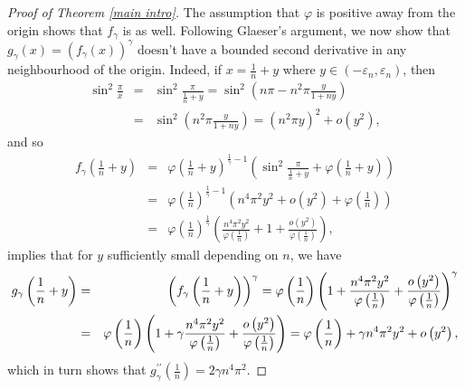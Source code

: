 \documentclass{amsart}
\theoremstyle{plain}
\numberwithin{equation}{section}
\begin{document}
\begin{proof}[Proof of Theorem \protect\ref{main intro}]
The assumption that $\varphi $ is positive away from the origin shows that $%
f_{\gamma }$ is as well. Following Glaeser's argument, we now show that $%
g_{\gamma }\left( x\right) =\left( f_{\gamma }\left( x\right) \right)
^{\gamma }$ doesn't have a bounded second derivative in any neighbourhood of
the origin. Indeed, if $x=\frac{1}{n}+y$ where $y\in \left( -\varepsilon
_{n},\varepsilon _{n}\right) $, then%
\begin{eqnarray*}
\sin ^{2}\frac{\pi }{x} &=&\sin ^{2}\frac{\pi }{\frac{1}{n}+y}=\sin
^{2}\left( n\pi -n^{2}\pi \frac{y}{1+ny}\right) \\
&=&\sin ^{2}\left( n^{2}\pi \frac{y}{1+ny}\right) =\left( n^{2}\pi y\right)
^{2}+o\left( y^{2}\right) ,
\end{eqnarray*}%
and so%
\begin{eqnarray*}
f_{\gamma }\left( \frac{1}{n}+y\right) &=&\varphi \left( \frac{1}{n}
+y\right) ^{\frac{1}{\gamma }-1}\left( \sin ^{2}\frac{\pi }{\frac{1}{n}+y}
+\varphi \left( \frac{1}{n}+y\right) \right) \\
&=&\varphi \left( \frac{1}{n}\right) ^{\frac{1}{\gamma }-1}\left( n^{4}\pi
^{2}y^{2}+o\left( y^{2}\right) +\varphi \left( \frac{1}{n}\right) \right) \\
&=&\varphi \left( \frac{1}{n}\right) ^{\frac{1}{\gamma }}\left( \frac{
n^{4}\pi ^{2}y^{2}}{\varphi \left( \frac{1}{n}\right) }+1+\frac{o\left(
y^{2}\right) }{\varphi \left( \frac{1}{n}\right) }\right) ,
\end{eqnarray*}%
implies that for $y$ sufficiently small depending on $n$, we have%
\begin{eqnarray*}
g_{\gamma }\left( \frac{1}{n}+y\right) &=&\left( f_{\gamma }\left( \frac{1}{%
n }+y\right) \right) ^{\gamma }=\varphi \left( \frac{1}{n}\right) \left( 1+ 
\frac{n^{4}\pi ^{2}y^{2}}{\varphi \left( \frac{1}{n}\right) }+\frac{o\left(
y^{2}\right) }{\varphi \left( \frac{1}{n}\right) }\right) ^{\gamma } \\
&=&\varphi \left( \frac{1}{n}\right) \left( 1+\gamma \frac{n^{4}\pi
^{2}y^{2} }{\varphi \left( \frac{1}{n}\right) }+\frac{o\left( y^{2}\right) }{%
\varphi \left( \frac{1}{n}\right) }\right) =\varphi \left( \frac{1}{n}%
\right) +\gamma n^{4}\pi ^{2}y^{2}+o\left( y^{2}\right) ,
\end{eqnarray*}%
which in turn shows that $g_{\gamma }^{\prime \prime }\left( \frac{1}{n}%
\right) =2\gamma n^{4}\pi ^{2}$.


\end{proof}
\end{document}
